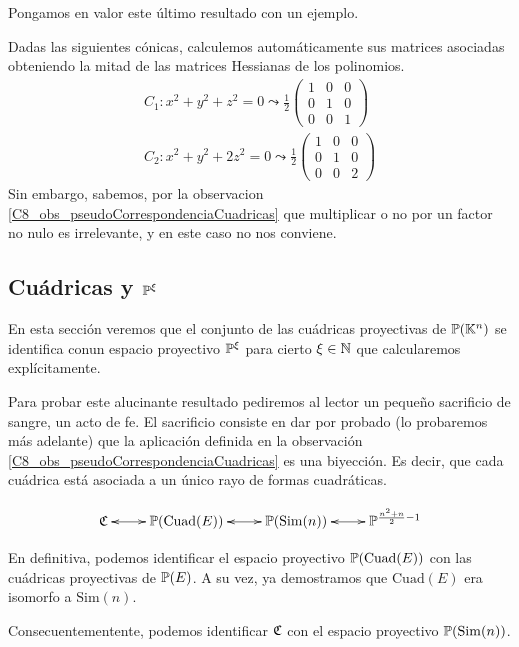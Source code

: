 Pongamos en valor este último resultado con un ejemplo.
\begin{exa}
	Dadas las siguientes cónicas, calculemos automáticamente sus matrices asociadas obteniendo la mitad de las matrices Hessianas de los polinomios.
	\[\begin{array}{c}
	C_1:x^2+y^2+z^2=0\leadsto\frac{1}{2}\begin{pmatrix}
	1 & 0 & 0\\
	0 & 1 & 0\\
	0 & 0 & 1
	\end{pmatrix}\\
	C_2:x^2+y^2+2z^2=0\leadsto\frac{1}{2}\begin{pmatrix}
	1 & 0 & 0\\
	0 & 1 & 0\\
	0 & 0 & 2
	\end{pmatrix}
	\end{array}\]
	Sin embargo, sabemos, por la observacion \ref{C8_obs_pseudoCorrespondenciaCuadricas} que multiplicar o no por un factor no nulo es irrelevante, y en este caso no nos conviene.
\end{exa}
\subsection{Cuádricas y $\mathbb{P}^\xi$}
En esta sección veremos que el conjunto de las cuádricas proyectivas de $\mathbb{P}(\mathbb{K}^n)$ se identifica conun espacio proyectivo $\mathbb{P}^\xi$ para cierto $\xi\in\mathbb{N}$ que calcularemos explícitamente.

Para probar este alucinante resultado pediremos al lector un pequeño sacrificio de sangre, un acto de fe. El sacrificio consiste en dar por probado (lo probaremos más adelante) que la aplicación definida en la observación \ref{C8_obs_pseudoCorrespondenciaCuadricas} es una biyección. Es decir, que cada cuádrica está asociada a un único rayo de formas cuadráticas.

\[
\xymatrix
{
	\mf{C} \ar@{<->}[r]& \proy(\mathrm{Cuad}(E)) \ar@{<->}[r]& \proy(\mathrm{Sim}(n)) \ar@{<->}[r]& \proy^{\frac{n^2+n}{2}-1}
}
\]

En definitiva, podemos identificar el espacio proyectivo $\mathbb{P}(\mathrm{Cuad}(E))$ con las cuádricas proyectivas de $\mathbb{P}(E)$. A su vez, ya demostramos que $\mathrm{Cuad}(E)$ era isomorfo a $\mathrm{Sim}(n)$.

Consecuentementente, podemos identificar $\mathfrak{C}$ con el espacio proyectivo $\mathbb{P}(\mathrm{Sim}(n))$.

